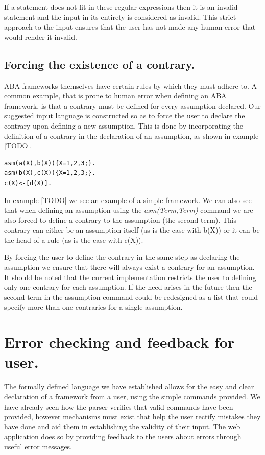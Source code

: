 If a statement does not fit in these regular expressions then it is an invalid statement and the input in its entirety is considered as invalid. This strict approach to the input ensures that the user has not made any human error that would render it invalid.

\subsection{Forcing the existence of a contrary.}

ABA frameworks themselves have certain rules by which they must adhere to. A common example, that is prone to human error when defining an ABA framework, is that a contrary must be defined for every assumption declared. Our suggested input language is constructed so as to force the user to declare the contrary upon defining a new assumption. This is done by incorporating the definition of a contrary in the declaration of an assumption, as shown in example [TODO].

\begin{Verbatim}[frame=single]
asm(a(X),b(X)){X=1,2,3;}.
asm(b(X),c(X)){X=1,2,3;}.
c(X)<-[d(X)].
\end{Verbatim}

In example [TODO] we see an example of a simple framework. We can also see that when defining an assumption using the \emph{asm(Term,Term)} command we are also forced to define a contrary to the assumption (the second term). This contrary can either be an assumption itself (as is the case with b(X)) or it can be the head of a rule (as is the case with c(X)).

By forcing the user to define the contrary in the same step as declaring the assumption we ensure that there will always exist a contrary for an assumption. It should be noted that the current implementation restricts the user to defining only one contrary for each assumption. If the need arises in the future then the second term in the assumption command could be redesigned as a list that could specify more than one contraries for a single assumption.

\section{Error checking and feedback for user.}
The formally defined language we have established allows for the easy and clear declaration of a framework from a user, using the simple commands provided. We have already seen how the parser verifies that valid commands have been provided, however mechanisms must exist that help the user rectify mistakes they have done and aid them in establishing the validity of their input. The web application does so by providing feedback to the users about errors through useful error messages.

